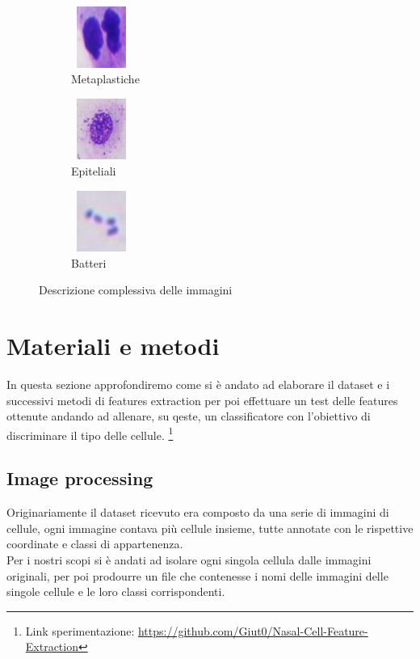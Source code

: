 \documentclass[italian,10pt,a4paper]{article}
\begin{document}
\begin{figure}[h]
						\label{fig:multiple_images2}
						\begin{subfigure}[h]{70px}
							\centering
							\includegraphics[width=2cm, height=2cm]{img/metaplatic.jpg}
							\caption{Metaplastiche}
							\label{fig:image7}
						\end{subfigure}
						\hfill
						\begin{subfigure}[h]{70px}
							\centering
							\includegraphics[width=2cm, height=2cm]{img/epiteliali.jpg}
							\caption{Epiteliali}
							\label{fig:image8}
						\end{subfigure}
						\hfill
						\begin{subfigure}[h]{70px}
							\centering
							\includegraphics[width=2cm, height=2cm]{img/batteri.jpg}
							\caption{Batteri}
							\label{fig:image9}
						\end{subfigure}
						
						\caption{Descrizione complessiva delle immagini}
						\label{fig:multiple_images3}
					\end{figure}
		
	\section{Materiali e metodi}
		In questa sezione approfondiremo come si è andato ad elaborare il dataset e i successivi metodi di features extraction per poi effettuare un test delle features ottenute andando ad allenare, su qeste, un classificatore con l'obiettivo di discriminare il tipo delle cellule. \footnote{Link sperimentazione: \href{https://github.com/Giut0/Nasal-Cell-Feature-Extraction}{https://github.com/Giut0/Nasal-Cell-Feature-Extraction}}
		
		\subsection{Image processing}
			Originariamente il dataset ricevuto era composto da una serie di immagini di cellule, ogni immagine contava più cellule insieme, tutte annotate con le rispettive coordinate e classi di appartenenza.\\
			\linebreak
			Per i nostri scopi si è andati ad isolare ogni singola cellula dalle immagini originali, per poi prodourre un file che contenesse i nomi delle immagini delle singole cellule e le loro classi corrispondenti.
			
\end{document}
